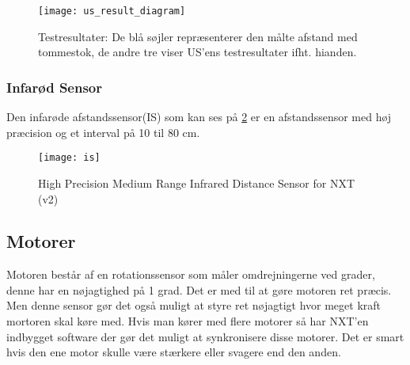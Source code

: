 \begin{figure}[h]
\centering
\texttt{[image: us\_result\_diagram]}
\caption{Testresultater: De blå søjler repræsenterer den målte afstand med tommestok, de andre tre viser US'ens testresultater ifht. hianden.}
\label{sensor:ultrasonic_resultat_diagram}
\end{figure}


\subsubsection{Infarød Sensor}
Den infarøde afstandssensor(IS) som kan ses på \ref{sensor:infraroed_sensor} er en afstandssensor med høj præcision og et interval på 10 til 80 cm.

\begin{figure}[h]
\centering
\texttt{[image: is]} 	
\caption{High Precision Medium Range Infrared Distance Sensor for NXT (v2)}
\label{sensor:infraroed_sensor}
\end{figure}

\subsection{Motorer}
Motoren består af en rotationssensor som måler omdrejningerne ved grader, denne har en nøjagtighed på 1 grad. Det er med til at gøre motoren ret præcis. Men denne sensor gør det også muligt at styre ret nøjagtigt hvor meget kraft mortoren skal køre med.
Hvis man kører med flere motorer så har NXT'en indbygget software der gør det muligt at synkronisere disse motorer.
Det er smart hvis den ene motor skulle være stærkere eller svagere end den anden.